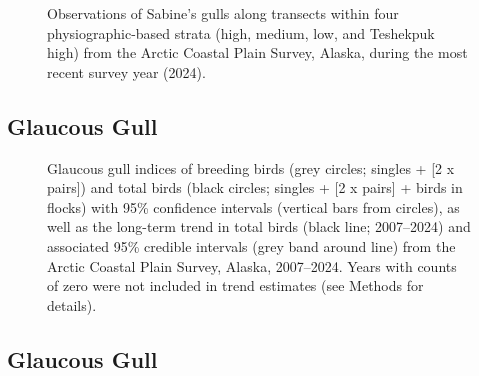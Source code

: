\documentclass[
]{article}
\begin{document}
\begin{figure}


\caption{\label{fig-SAGUmap}Observations of Sabine's gulls along
transects within four physiographic-based strata (high, medium, low, and
Teshekpuk high) from the Arctic Coastal Plain Survey, Alaska, during the
most recent survey year (2024).}

\end{figure}%

\newpage{}

\subsection*{Glaucous Gull}\label{glaucous-gull}

\begin{figure}


\caption{\label{fig-GLGU}Glaucous gull indices of breeding birds (grey
circles; singles + {[}2 x pairs{]}) and total birds (black circles;
singles + {[}2 x pairs{]} + birds in flocks) with 95\% confidence
intervals (vertical bars from circles), as well as the long-term trend
in total birds (black line; 2007--2024) and associated 95\% credible
intervals (grey band around line) from the Arctic Coastal Plain Survey,
Alaska, 2007--2024. Years with counts of zero were not included in trend
estimates (see Methods for details).}

\end{figure}%

\newpage{}

\subsection*{Glaucous Gull}\label{glaucous-gull-1}

\begingroup\fontsize{10}{12}\selectfont
\end{document}
